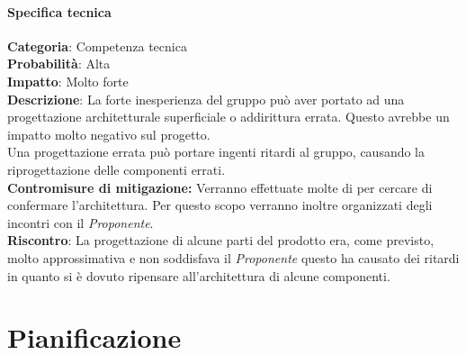 \documentclass{scalatekids-article}
\begin{document}
\paragraph{Specifica tecnica}
\textbf{Categoria}: Competenza tecnica\\
\textbf{Probabilità}: Alta\\
\textbf{Impatto}: Molto forte\\
\textbf{Descrizione}: La forte inesperienza del gruppo può aver portato ad una progettazione architetturale superficiale o addirittura errata. Questo avrebbe un impatto molto negativo sul progetto.\\Una progettazione errata può portare ingenti ritardi al gruppo, causando la riprogettazione delle componenti errati.\\
\textbf{Contromisure di mitigazione:} Verranno effettuate molte  di  per cercare di confermare l'architettura. Per questo scopo verranno inoltre organizzati degli incontri con il \textit{Proponente}.\\
\textbf{Riscontro}: La progettazione di alcune parti del prodotto era, come previsto, molto approssimativa e non soddisfava il \textit{Proponente} questo ha causato dei ritardi in quanto si è dovuto ripensare all'architettura di alcune componenti.\\

\section{Pianificazione}
\end{document}
